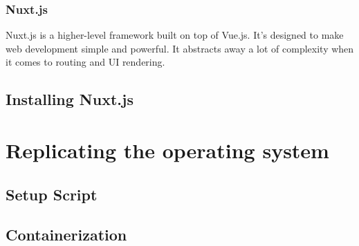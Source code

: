             \subsubsection{Nuxt.js}
            Nuxt.js is a higher-level framework built on top of Vue.js.
            It's designed to make web development simple and powerful.
            It abstracts away a lot of complexity when it comes to 
            routing and UI rendering.
            
        \subsection{Installing Nuxt.js}

    \section{Replicating the operating system}
        \subsection{Setup Script}
        \subsection{Containerization}

